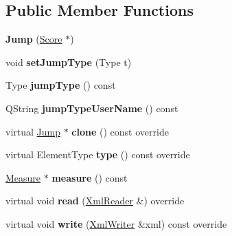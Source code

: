 \subsection*{Public Member Functions}
\begin{DoxyCompactItemize}
\item 
\mbox{\label{class_ms_1_1_jump_af91acf2674058112e578b8d9c376ac21}} 
{\bfseries Jump} (\hyperlink{class_ms_1_1_score}{Score} $\ast$)
\item 
\mbox{\label{class_ms_1_1_jump_a93892f9150ea35d2d3f84c0635668942}} 
void {\bfseries set\+Jump\+Type} (Type t)
\item 
\mbox{\label{class_ms_1_1_jump_a2394262a71a4f2a92d2046cca4647c36}} 
Type {\bfseries jump\+Type} () const
\item 
\mbox{\label{class_ms_1_1_jump_ac697de7a3e15f3ef0611eb76cd608f64}} 
Q\+String {\bfseries jump\+Type\+User\+Name} () const
\item 
\mbox{\label{class_ms_1_1_jump_af6343c7e70096d2b1348aedea677b52f}} 
virtual \hyperlink{class_ms_1_1_jump}{Jump} $\ast$ {\bfseries clone} () const override
\item 
\mbox{\label{class_ms_1_1_jump_a731b1a130904ce1d7301c98d2c441b63}} 
virtual Element\+Type {\bfseries type} () const override
\item 
\mbox{\label{class_ms_1_1_jump_a018c04bffe1e8605b15cd32423f21726}} 
\hyperlink{class_ms_1_1_measure}{Measure} $\ast$ {\bfseries measure} () const
\item 
\mbox{\label{class_ms_1_1_jump_a145c1698f0bb6f3bf4d71c666083122d}} 
virtual void {\bfseries read} (\hyperlink{class_ms_1_1_xml_reader}{Xml\+Reader} \&) override
\item 
\mbox{\label{class_ms_1_1_jump_a05697ac124f4298a409999d0e2fca4fa}} 
virtual void {\bfseries write} (\hyperlink{class_ms_1_1_xml_writer}{Xml\+Writer} \&xml) const override
\item 
\mbox{\label{class_ms_1_1_jump_ad5d0bd300463f329aacde2fe899f18a7}} 

\end{DoxyCompactItemize}
